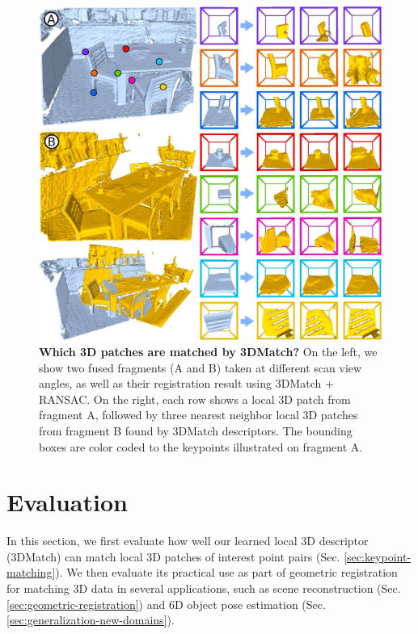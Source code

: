 \documentclass[10pt,twocolumn,letterpaper]{article}
\begin{document}
\begin{figure}[t]
\vspace{-3mm}
\centering
\includegraphics[width=1\linewidth]{images/keypoint-retrieval.jpg}
\caption{{\bf Which 3D patches are matched by 3DMatch?} On the left, we show two fused fragments (A and B) taken at different scan view angles, as well as their registration result using 3DMatch + RANSAC. On the right, each row shows a local 3D patch from fragment A, followed by three nearest neighbor local 3D patches from fragment B found by 3DMatch descriptors. The bounding boxes are color coded to the keypoints illustrated on fragment A.}
\label{fig:patch-matching}
\end{figure}

\section{Evaluation}
In this section, we first evaluate how well our learned local 3D descriptor (3DMatch) can match local 3D patches of interest point pairs (Sec. \ref{sec:keypoint-matching}). We then evaluate its practical use as part of geometric registration for matching 3D data in several applications, such as scene reconstruction (Sec. \ref{sec:geometric-registration}) and 6D object pose estimation (Sec. \ref{sec:generalization-new-domains}).
\end{document}
